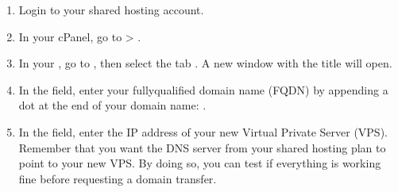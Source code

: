 \documentclass[a4paper,10pt,english,openany,oneside]{sphinxmanual}
\begin{document}
\begin{enumerate}
%
\item {} 
\sphinxAtStartPar
Login to your shared hosting account.

\item {} 
\sphinxAtStartPar
In your cPanel, go to  > .
\begin{quote}

\begin{figure}[H]
\centering

\noindent{}
\end{figure}
\end{quote}

\item {} 
\sphinxAtStartPar
In your , go to , then select the tab . A new window with the title  will open.
\begin{quote}

\begin{figure}[H]
\centering

\noindent{}
\end{figure}
\end{quote}

\item {} 
\sphinxAtStartPar
In the  field, enter your fully\sphinxhyphen{}qualified domain name (FQDN) by appending a dot at the end of your domain name: .
\begin{quote}

\begin{figure}[H]
\centering

\noindent{}
\end{figure}

\newpage
\end{quote}

\item {} 
\sphinxAtStartPar
In the  field, enter the IP address of your new Virtual Private Server (VPS). Remember that you want the DNS server from your shared hosting plan to point to your new VPS. By doing so, you can test if everything is working fine before requesting a domain transfer.
\begin{quote}

\begin{figure}[H]
\centering

\noindent{}
\end{figure}
\end{quote}

\end{enumerate}
\end{document}
